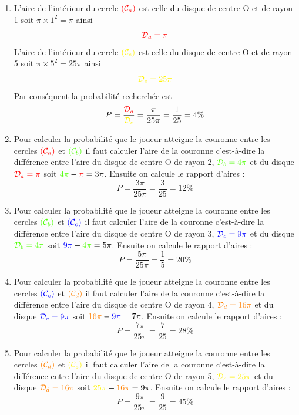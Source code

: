\documentclass[11pt]{article}
\begin{document}
\begin{enumerate}
\item L'aire de l'intérieur du cercle \(\textcolor{red}{(\mathcal{C}_a)}\)
est celle du disque de centre O et de rayon 1 soit \(\pi\times 1^2 =
   \pi\) ainsi \[\textcolor{red}{\mathcal{D}_a = \pi}\]
L'aire de l'intérieur du cercle
\(\textcolor{yellow}{(\mathcal{C}_e)}\) est celle du disque de centre
O et de rayon 5 soit \(\pi\times 5^2 = 25\pi\) ainsi
\[\textcolor{yellow}{\mathcal{D}_e = 25\pi}\]
Par conséquent la probabilité recherchée est  \[P = \dfrac{
   \textcolor{red}{\mathcal{D}_a}}{\textcolor{yellow}{\mathcal{D}_e}}
   = \dfrac{\pi}{25\pi} = \dfrac{1}{25} = 4\%\]
\item Pour calculer la probabilité que le joueur atteigne la couronne
entre les cercles \(\textcolor{red}{(\mathcal{C}_a)}\) et
\(\textcolor{lime}{(\mathcal{C}_b)}\) il faut calculer l'aire de la
couronne c'est-à-dire la différence entre l'aire du disque de
centre O de rayon 2, \(\textcolor{lime}{\mathcal{D}_b = 4\pi}\) et du
disque \(\textcolor{red}{\mathcal{D}_a = \pi}\) soit
\(\textcolor{lime}{4\pi} - \textcolor{red}{\pi} = 3\pi\). Ensuite on
calcule le rapport d'aires : \[P = \dfrac{3\pi}{25\pi} =
   \dfrac{3}{25} = 12\%\]
\item Pour calculer la probabilité que le joueur atteigne la couronne
entre les cercles \(\textcolor{lime}{(\mathcal{C}_b)}\) et
\(\textcolor{navy}{(\mathcal{C}_c)}\) il faut calculer l'aire de la
couronne c'est-à-dire la différence entre l'aire du disque de
centre O de rayon 3, \(\textcolor{navy}{\mathcal{D}_c = 9\pi}\) et du
disque \(\textcolor{lime}{\mathcal{D}_b = 4\pi}\) soit
\(\textcolor{navy}{9\pi} - \textcolor{lime}{4\pi} = 5\pi\). Ensuite
on calcule le rapport d'aires : \[P = \dfrac{5\pi}{25\pi} =
   \dfrac{1}{5} = 20\%\]
\item Pour calculer la probabilité que le joueur atteigne la couronne
entre les cercles \(\textcolor{navy}{(\mathcal{C}_c)}\) et
\(\textcolor{orange}{(\mathcal{C}_d)}\) il faut calculer l'aire de la
couronne c'est-à-dire la différence entre l'aire du disque de
centre O de rayon 4, \(\textcolor{orange}{\mathcal{D}_d = 16\pi}\) et
du disque \(\textcolor{navy}{\mathcal{D}_c = 9\pi}\) soit
\(\textcolor{orange}{16\pi} - \textcolor{navy}{9\pi} =
   7\pi\). Ensuite on calcule le rapport d'aires : \[P =
   \dfrac{7\pi}{25\pi} = \dfrac{7}{25} = 28\%\]
\item Pour calculer la probabilité que le joueur atteigne la couronne
entre les cercles \(\textcolor{orange}{(\mathcal{C}_d)}\) et
\(\textcolor{yellow}{(\mathcal{C}_e)}\)  il faut calculer l'aire de
la couronne c'est-à-dire la différence entre l'aire du disque de
centre O de rayon 5, \(\textcolor{yellow}{\mathcal{D}_e = 25\pi}\) et
du disque \(\textcolor{orange}{\mathcal{D}_d = 16\pi}\) soit
\(\textcolor{yellow}{25\pi} - \textcolor{orange}{16\pi} =
   9\pi\). Ensuite on calcule le rapport d'aires : \[P =
   \dfrac{9\pi}{25\pi} = \dfrac{9}{25} = 45\%\]
\end{enumerate}
\end{document}
